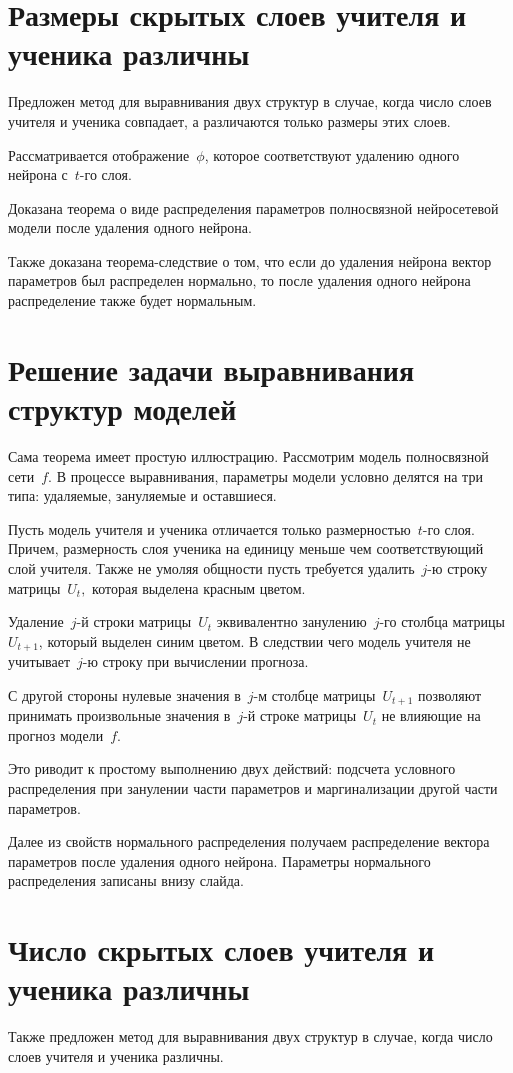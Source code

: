 \documentclass[10pt, twoside]{article}
\begin{document}
\section{Размеры скрытых слоев учителя и ученика различны}
Предложен метод для выравнивания двух структур в случае, когда число слоев учителя и ученика совпадает, а различаются только размеры этих слоев.

Рассматривается отображение~$\phi$, которое соответствуют удалению одного нейрона с~$t$-го слоя.

Доказана теорема о виде распределения параметров полносвязной нейросетевой модели после удаления одного нейрона.

Также доказана теорема-следствие о том, что если до удаления нейрона вектор параметров был распределен нормально, то после удаления одного нейрона распределение также будет нормальным.

\section{Решение задачи выравнивания структур моделей}
Сама теорема имеет простую иллюстрацию. Рассмотрим модель полносвязной сети~$f$. В процессе выравнивания, параметры модели условно делятся на три типа: удаляемые, зануляемые и оставшиеся.

Пусть модель учителя и ученика отличается только размерностью~$t$-го слоя. Причем, размерность слоя ученика на единицу меньше чем соответствующий слой учителя. Также не умоляя общности пусть требуется удалить~$j$-ю строку матрицы~$U_t,$ которая выделена красным цветом.

Удаление~$j$-й строки матрицы~$U_t$ эквивалентно занулению~$j$-го столбца матрицы~$U_{t+1}$, который выделен синим цветом. В следствии чего модель учителя не учитывает~$j$-ю строку при вычислении прогноза.

С другой стороны нулевые значения в~$j$-м столбце матрицы~$U_{t+1}$ позволяют принимать произвольные значения в~$j$-й строке матрицы~$U_{t}$ не влияющие на прогноз модели~$f$.

Это риводит к простому выполнению двух действий: подсчета условного распределения при занулении части параметров и маргинализации другой части параметров.

Далее из свойств нормального распределения получаем распределение вектора параметров после удаления одного нейрона. Параметры нормального распределения записаны внизу слайда.

\section{Число скрытых слоев учителя и ученика различны}
Также предложен метод для выравнивания двух структур в случае, когда число слоев учителя и ученика различны.
\end{document}

